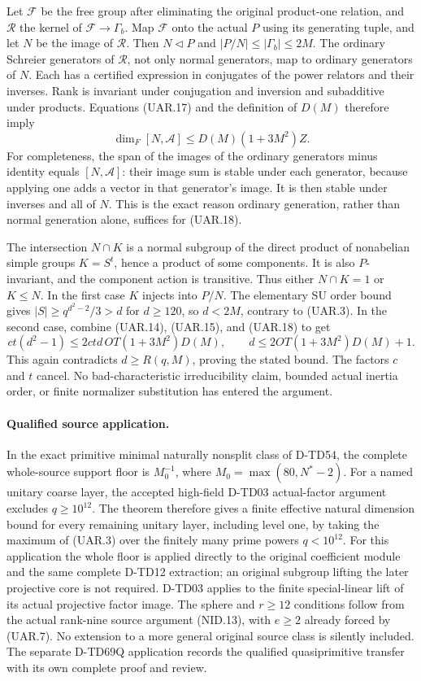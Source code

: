 Let \(\mathcal F\) be the free group after eliminating the original
product-one relation, and \(\mathcal R\) the kernel of
\(\mathcal F\to\Gamma_b\). Map \(\mathcal F\) onto the actual
\(P\) using its generating tuple, and let \(N\) be the image of
\(\mathcal R\). Then \(N\triangleleft P\) and
\(|P/N|\le|\Gamma_b|\le2M\).
The ordinary Schreier generators of \(\mathcal R\), not only
normal generators, map to ordinary generators of \(N\).
Each has a certified expression in conjugates of the power relators
and their inverses. Rank is invariant under conjugation and
inversion and subadditive under products. Equations (UAR.17) and
the definition of \(D(M)\) therefore imply
\[
 \dim_F[N,\mathcal A]
             \le D(M)(1+3M^2)Z.
 \tag{UAR.18}
\]
For completeness, the span of the images of the ordinary generators
minus identity equals \([N,\mathcal A]\): their image sum is stable
under each generator, because applying one adds a vector in that
generator's image. It is then stable under inverses and all of
\(N\). This is the exact reason ordinary generation, rather than
normal generation alone, suffices for (UAR.18).

The intersection \(N\cap K\) is a normal subgroup of the direct
product of nonabelian simple groups \(K=S^t\), hence a product of
some components. It is also \(P\)-invariant, and the component
action is transitive. Thus either \(N\cap K=1\) or \(K\le N\).
In the first case \(K\) injects into \(P/N\). The elementary SU
order bound gives
\(|S|\ge q^{d^2-2}/3>d\) for \(d\ge120\), so \(d<2M\),
contrary to (UAR.3).
In the second case, combine (UAR.14), (UAR.15), and (UAR.18) to get
\[
      ct(d^2-1)\le 2ctd\,OT(1+3M^2)D(M),\qquad
      d\le2OT(1+3M^2)D(M)+1.
 \tag{UAR.19}
\]
This again contradicts \(d\ge R(q,M)\), proving the stated
bound. The factors \(c\) and \(t\) cancel. No bad-characteristic
irreducibility claim, bounded actual inertia order, or finite
normalizer substitution has entered the argument.

\paragraph{Qualified source application.}
In the exact primitive minimal naturally nonsplit class of D-TD54,
the complete whole-source support floor is
\(M_0^{-1}\), where \(M_0=\max(80,N^*-2)\).
For a named unitary coarse layer, the accepted high-field
D-TD03 actual-factor argument excludes \(q\ge10^{12}\).
The theorem therefore gives a finite effective natural
dimension bound for every remaining unitary layer, including level
one, by taking the maximum of (UAR.3) over the finitely many prime
powers \(q<10^{12}\). For this application the whole floor is
applied directly to the original coefficient module and the same
complete D-TD12 extraction; an original subgroup lifting the later
projective core is not required. D-TD03 applies to the finite
special-linear lift of its actual projective factor image.
The sphere and \(r\ge12\) conditions follow from the actual
rank-nine source argument (NID.13), with \(e\ge2\) already forced
by (UAR.7). No extension to a more general original source class is
silently included. The separate D-TD69Q application records the
qualified quasiprimitive transfer with its own complete proof and review.
